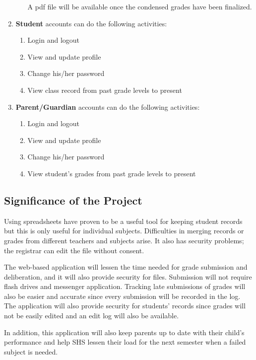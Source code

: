 \documentclass[11pt,a4paper,titlepage]{article}
\begin{document}
\begin{enumerate}
\begin{enumerate}
        A pdf file will be available once the condensed grades have been finalized.
    \end{enumerate}
    \item \textbf{Student} accounts can do the following activities:
    \begin{enumerate}
        \item Login and logout
        \item View and update profile
        \item Change his/her password
        \item View class record from past grade levels to present
    \end{enumerate}
    \item \textbf{Parent/Guardian} accounts can do the following activities:
    \begin{enumerate}
        \item Login and logout
        \item View and update profile
        \item Change his/her password
        \item View student's grades from past grade levels to present
    \end{enumerate}


\end{enumerate}

\subsection{Significance of the Project}
Using spreadsheets have proven to be a useful tool for keeping student records but this is only useful for individual subjects. Difficulties in merging records or grades from different teachers and subjects arise. It also has security problems; the registrar can edit the file without consent.

The web-based application will lessen the time needed for grade submission and deliberation, and it will also provide security for files. Submission will not require flash drives and messenger application. Tracking late submissions of grades will also be easier and accurate since every submission will be recorded in the log. The application will also provide security for students' records since grades will not be easily edited and an edit log will also be available.

In addition, this application will also keep parents up to date with their child's performance and help SHS lessen their load for the next semester when a failed subject is needed.
\end{document}
